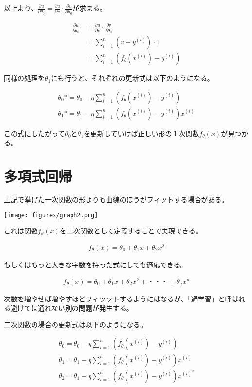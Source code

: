 \documentclass{jsarticle}
\begin{document}
以上より、$\frac{\partial u}{\partial \theta_{0}} = \frac{\partial u}{\partial v} \cdot \frac{\partial v}{\partial \theta_{0}}$が求まる。

\begin{align}
	\frac{\partial u}{\partial \theta_{0}} &= \frac{\partial u}{\partial v} \cdot \frac{\partial v}{\partial \theta_{0}}\\
    &= \sum_{i=1}^{n} (v-y^{(i)}) \cdot 1\\
    &= \sum_{i=1}^{n} (f_\theta(x^{(i)}) - y^{(i)})
\end{align}

同様の処理を$\theta_1$にも行うと、それぞれの更新式は以下のようになる。

\begin{align}
	\theta_0 *= \theta_0 - \eta \sum_{i=1}^{n} (f_\theta(x^{(i)}) - y^{(i)})\\
    \theta_1 *= \theta_1 - \eta \sum_{i=1}^{n} (f_\theta(x^{(i)}) - y^{(i)}) x^{(i)}
\end{align}

この式にしたがって$\theta_0$と$\theta_1$を更新していけば正しい形の１次関数$f_{\theta}(x)$が見つかる。


\section{多項式回帰}
上記で挙げた一次関数の形よりも曲線のほうがフィットする場合がある。

\begin{center}
  \texttt{[image: figures/graph2.png]}
\end{center}

これは関数$f_\theta(x)$を二次関数として定義することで実現できる。

\begin{align}
	f_{\theta}(x) = \theta_0 + \theta_1 x + \theta_2 x^{2}
\end{align}

もしくはもっと大きな字数を持った式にしても適応できる。

\begin{align}
	f_{\theta}(x) = \theta_0 + \theta_1 x + \theta_2 x^{2} + ・・・  + \theta_n x^{n}
\end{align}

次数を増やせば増やすほどフィッットするようにはなるが、「過学習」と呼ばれる避けては通れない別の問題が発生する。

二次関数の場合の更新式は以下のようになる。

\begin{align}
	\theta_0 = \theta_0 - \eta \sum_{i=1}^{n} (f_\theta(x^{(i)}) - y^{(i)})\\
    \theta_1 = \theta_1 - \eta \sum_{i=1}^{n} (f_\theta(x^{(i)}) - y^{(i)}) x^{(i)}\\
    \theta_2 = \theta_1 - \eta \sum_{i=1}^{n} (f_\theta(x^{(i)}) - y^{(i)}) x^{(i)^{2}}
\end{align}
\end{document}
